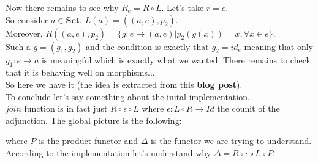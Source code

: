 \documentclass[a4paper,12pt]{article}
\begin{document}
Now there remains to see why $R_e=R \circ L$. Let's take $r=e$.\\ So consider $a \in \textbf{Set}$. $L(a)=((a,e),p_2)$.\\
Moreover, $R((a,e),p_2)=\{g:e \to (a,e) | p_2(g(x))=x, \forall x \in e\}$.\\ Such a $g=(g_1,g_2)$ and the condition is exactly that $g_2 = id_e$ meaning that only $g_1:e \to a$ is meaningful which is exactly what we wanted. There remains to check that it is behaving well on morphisms...\\
So here we have it (the idea is extracted from this \href{http://blog.higher-order.com/blog/2015/09/30/the-adjunction-that-induces-the-reader-monad/}{\textbf{blog post}}).\\
To conclude let's say something about the inital implementation.\\
$join$ function is in fact just $R\circ \epsilon \circ L$ where $\epsilon: L\circ R \to Id$ the counit of the adjunction. The global picture is the following:

\begin{center}
\end{center}
where $P$ is the product functor and $\Delta$ is the functor we are trying to understand.
According to the implementation let's understand why $\Delta=R\circ \epsilon \circ L \circ P$.
\end{document}
